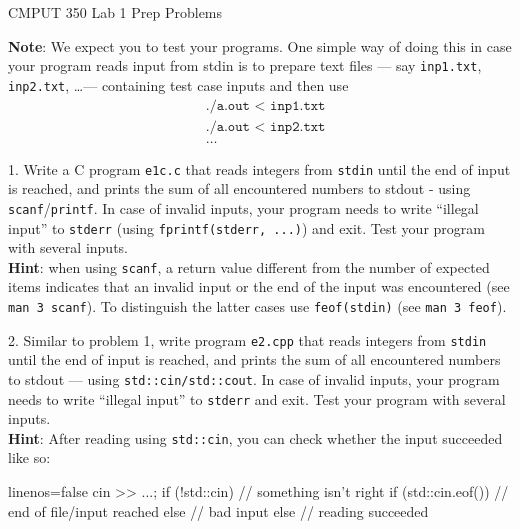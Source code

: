 \documentclass[a4paper,11pt]{article}
\begin{document}

\begin{center}
{\Large CMPUT 350 Lab 1 Prep Problems}
\end{center}

\linerule

\textbf{Note}: We expect you to test your programs. 
One simple way of doing this in case your program reads input from stdin is to prepare text files --- 
say \texttt{inp1.txt}, \texttt{inp2.txt}, \dots --- containing test case inputs and then use
\begin{align*}
    &\texttt{./a.out < inp1.txt} \\
    &\texttt{./a.out < inp2.txt} \\
    &\dots
\end{align*}

\linerule

1. Write a C program \texttt{e1c.c} that reads integers from \texttt{stdin} until the end of input is reached, 
and prints the sum of all encountered numbers to stdout - using \texttt{scanf}/\texttt{printf}. 
In case of invalid inputs, your program needs to write ``illegal input'' to \texttt{stderr} (using \texttt{fprintf(stderr, ...)}) and exit. 
Test your program with several inputs. \\

\textbf{Hint}: when using \texttt{scanf}, 
a return value different from the number of expected items indicates that an invalid input or the end of the input was encountered (see \texttt{man 3 scanf}). 
To distinguish the latter cases use \texttt{feof(stdin)} (see \texttt{man 3 feof}).

\linerule

2. Similar to problem 1, write {\CC} program \texttt{e2.cpp} that reads integers from \texttt{stdin} until the end of input is reached, 
and prints the sum of all encountered numbers to stdout --- using \texttt{std::cin/std::cout}. 
In case of invalid inputs, your program needs to write ``illegal input'' to \texttt{stderr} and exit. 
Test your program with several inputs.\\

\textbf{Hint}: After reading using \texttt{std::cin}, you can check whether the input succeeded like so:
\begin{cppcode*}{linenos=false}
cin >> ...;
if (!std::cin) {
    // something isn't right
    if (std::cin.eof()) {
        // end of file/input reached
    } else {
        // bad input
    }
} else {
    // reading succeeded
}
\end{cppcode*}
\end{document}

